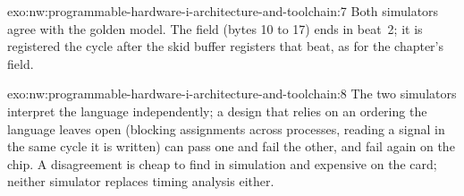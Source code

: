 \begin{solution}{exo:nw:programmable-hardware-i-architecture-and-toolchain:7}
Both simulators agree with the golden model. The field (bytes 10 to 17) ends in beat~2; it is registered the cycle after the skid buffer
registers that beat, as for the chapter's field.
\end{solution}

\begin{solution}{exo:nw:programmable-hardware-i-architecture-and-toolchain:8}
The two simulators interpret the language independently; a design that relies on an ordering the language leaves open (blocking
assignments across processes, reading a signal in the same cycle it is written) can pass one and fail the other, and fail again on
the chip. A disagreement is cheap to find in simulation and expensive on the card; neither simulator replaces timing analysis either.
\end{solution}

